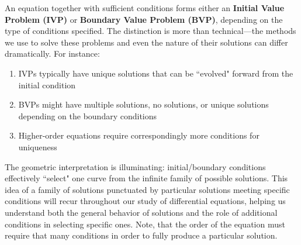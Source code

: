 \noindent An equation together with sufficient conditions forms either an \textbf{Initial Value Problem (IVP)} or \textbf{Boundary Value Problem (BVP)}, depending on the type of conditions specified. The distinction is more than technical—the methods we use to solve these problems and even the nature of their solutions can differ dramatically. For instance:

\begin{enumerate}
   \item IVPs typically have unique solutions that can be ``evolved" forward from the initial condition
   \item BVPs might have multiple solutions, no solutions, or unique solutions depending on the boundary conditions
   \item Higher-order equations require correspondingly more conditions for uniqueness
\end{enumerate}

\noindent The geometric interpretation is illuminating: initial/boundary conditions effectively ``select" one curve from the infinite family of possible solutions. This idea of a family of solutions punctuated by particular solutions meeting specific conditions will recur throughout our study of differential equations, helping us understand both the general behavior of solutions and the role of additional conditions in selecting specific ones. Note, that the order of the equation must require that many conditions in order to fully produce a particular solution.

